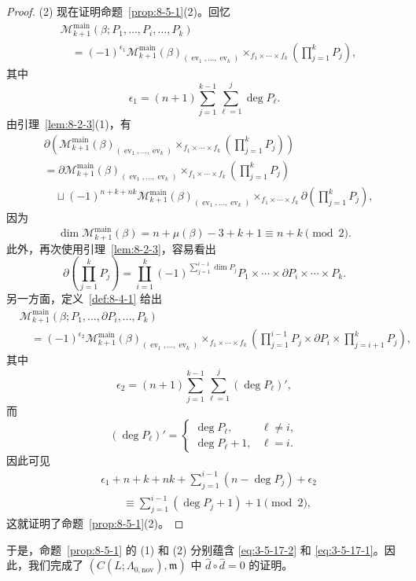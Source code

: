 \begin{proof}
\par\smallskip
(2) 现在证明命题~\ref{prop:8-5-1}(2)。回忆
\[
\begin{aligned}
 &\mathcal M_{k+1}^{\mathrm{main}}
 (\beta;P_1,\ldots,P_i,\ldots,P_k)\\
 &\quad={}
 (-1)^{\epsilon_1}
 \mathcal M_{k+1}^{\mathrm{main}}(\beta)_
 {(\operatorname{ev}_1,\ldots,\operatorname{ev}_k)}
 \mathop{\times}_{f_1\times\cdots\times f_k}
 \left(\prod_{j=1}^{k}P_j\right),
\end{aligned}
\]
其中
\[
 \epsilon_1=(n+1)
 \sum_{j=1}^{k-1}\sum_{\ell=1}^{j}\deg P_\ell.
\]
由引理~\ref{lem:8-2-3}(1)，有
\[
\begin{aligned}
 &\partial\left(
 \mathcal M_{k+1}^{\mathrm{main}}(\beta)_
 {(\operatorname{ev}_1,\ldots,\operatorname{ev}_k)}
 \mathop{\times}_{f_1\times\cdots\times f_k}
 \left(\prod_{j=1}^{k}P_j\right)\right)\\
 &={}
 \partial\mathcal M_{k+1}^{\mathrm{main}}(\beta)_
 {(\operatorname{ev}_1,\ldots,\operatorname{ev}_k)}
 \mathop{\times}_{f_1\times\cdots\times f_k}
 \left(\prod_{j=1}^{k}P_j\right)\\
 &\quad\sqcup
 (-1)^{n+k+nk}
 \mathcal M_{k+1}^{\mathrm{main}}(\beta)_
 {(\operatorname{ev}_1,\ldots,\operatorname{ev}_k)}
 \mathop{\times}_{f_1\times\cdots\times f_k}
 \partial\left(\prod_{j=1}^{k}P_j\right),
\end{aligned}
\]
因为
\[
 \dim\mathcal M_{k+1}^{\mathrm{main}}(\beta)
 =n+\mu(\beta)-3+k+1\equiv n+k\pmod2.
\]
此外，再次使用引理~\ref{lem:8-2-3}，容易看出
\[
 \partial\left(\prod_{j=1}^{k}P_j\right)
 =\coprod_{i=1}^{k}
 (-1)^{\sum_{j=1}^{i-1}\dim P_j}
 P_1\times\cdots\times\partial P_i\times\cdots\times P_k.
\]
另一方面，定义~\ref{def:8-4-1} 给出
\[
\begin{aligned}
 &\mathcal M_{k+1}^{\mathrm{main}}
 (\beta;P_1,\ldots,\partial P_i,\ldots,P_k)\\
 &\quad={}
 (-1)^{\epsilon_2}
 \mathcal M_{k+1}^{\mathrm{main}}(\beta)_
 {(\operatorname{ev}_1,\ldots,\operatorname{ev}_k)}
 \mathop{\times}_{f_1\times\cdots\times f_k}
 \left(\prod_{j=1}^{i-1}P_j\times\partial P_i\times
 \prod_{j=i+1}^{k}P_j\right),
\end{aligned}
\]
其中
\[
 \epsilon_2=(n+1)
 \sum_{j=1}^{k-1}\sum_{\ell=1}^{j}(\deg P_\ell)',
\]
而
\[
 (\deg P_\ell)'=
 \begin{cases}
  \deg P_\ell,&\ell\ne i,\\
  \deg P_\ell+1,&\ell=i.
 \end{cases}
\]
因此可见
\[
\begin{aligned}
 &\epsilon_1+n+k+nk+
 \sum_{j=1}^{i-1}(n-\deg P_j)+\epsilon_2\\
 &\qquad\equiv
 \sum_{j=1}^{i-1}(\deg P_j+1)+1\pmod2,
\end{aligned}
\]
这就证明了命题~\ref{prop:8-5-1}(2)。
\end{proof}

于是，命题~\ref{prop:8-5-1} 的 (1) 和 (2) 分别蕴含
\eqref{eq:3-5-17-2} 和 \eqref{eq:3-5-17-1}。因此，我们完成了
$(C(L;\Lambda_{0,\mathrm{nov}}),\mathfrak m)$ 中
$\widehat d\circ\widehat d=0$ 的证明。
